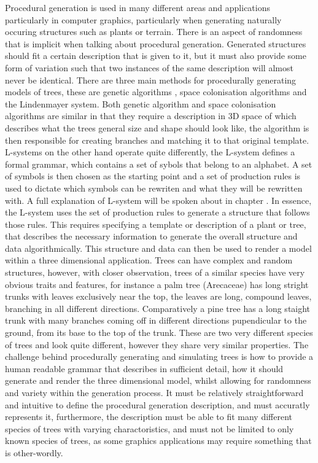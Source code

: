 \begin{flushleft}

Procedural generation is used in many different areas and applications particularly in computer graphics, particularly when generating naturally occuring structures such as plants or terrain. There is an aspect of randomness that is implicit when talking about procedural generation. Generated structures should fit a certain description that is given to it, but it must also provide some form of variation such that two instances of the same description will almost never be identical. There are three main methods for procedurally generating models of trees, these are genetic algorithms \cite{haubenwallner2017shapegenetics}, space colonisation algorithms\cite{juuso2017procedural} and the Lindenmayer system. Both genetic algorithm and space colonisation algorithms are similar in that they require a description in 3D space of which describes what the trees general size and shape should look like, the algorithm is then responsible for creating branches and matching it to that original template. L-systems on the other hand operate quite differently, the L-system defines a formal grammar, which contains a set of sybols that belong to an alphabet. A set of symbols is then chosen as the starting point and a set of production rules is used to dictate which symbols can be rewriten and what they will be rewritten with. A full explanation of L-system will be spoken about in chapter \label{l-system chapter}. In essence, the L-system uses the set of production rules to generate a structure that follows those rules. This requires specifying a template or description of a plant or tree, that describes the necessary information to generate the overall structure and data algorithmically. This structure and data can then be used to render a model within a three dimensional application. Trees can have complex and random structures, however, with closer observation, trees of a similar species have very obvious traits and features, for instance a palm tree (Arecaceae) has long stright trunks with leaves exclusively near the top, the leaves are long, compound leaves, branching in all different directions. Comparatively a pine tree has a long staight trunk with many branches coming off in different directions pupendicular to the ground, from its base to the top of the trunk. These are two very different species of trees and look quite different, however they share very similar properties. The challenge behind procedurally generating and simulating trees is how to provide a human readable grammar that describes in sufficient detail, how it should generate and render the three dimensional model, whilst allowing for randomness and variety within the generation process. It must be relatively straightforward and intuitive to define the procedural generation description, and must accuratly represents it, furthermore, the description must be able to fit many different species of trees with varying charactoristics, and must not be limited to only known species of trees, as some graphics applications may require something that is other-wordly.

\end{flushleft}

